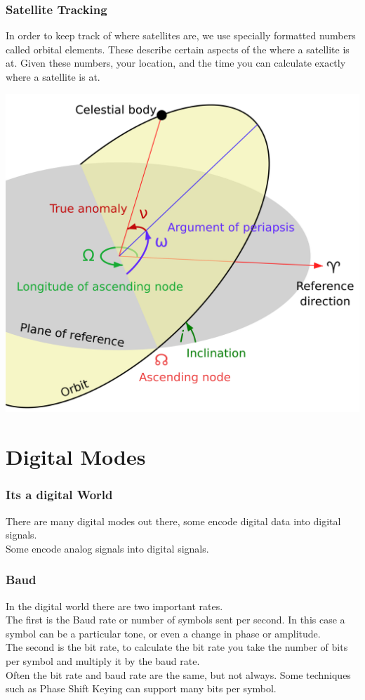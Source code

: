 \documentclass[10pt, handout]{beamer}
\begin{document}
\begin{frame}
\frametitle{Satellite Tracking}
In order to keep track of where satellites are, we use specially formatted numbers called orbital elements. These describe certain aspects of the where a satellite is at. Given these numbers, your location, and the time you can calculate exactly where a satellite is at.
\begin{center}
\includegraphics[height=.5\textheight]{orbitelements.png}
\end{center}
\end{frame}

\section{Digital Modes}

\begin{frame}
\frametitle{Its a digital World}
There are many digital modes out there, some encode digital data into digital signals.\\
Some encode analog signals into digital signals.
\end{frame}

\begin{frame}
\frametitle{Baud}
In the digital world there are two important rates.\\
The first is the Baud rate or number of symbols sent per second. In this case a symbol can be a particular tone, or even a change in phase or amplitude.\\
The second is the bit rate, to calculate the bit rate you take the number of bits per symbol and multiply it by the baud rate.\\
Often the bit rate and baud rate are the same, but not always. Some techniques such as Phase Shift Keying can support many bits per symbol.
\end{frame}
\end{document}
